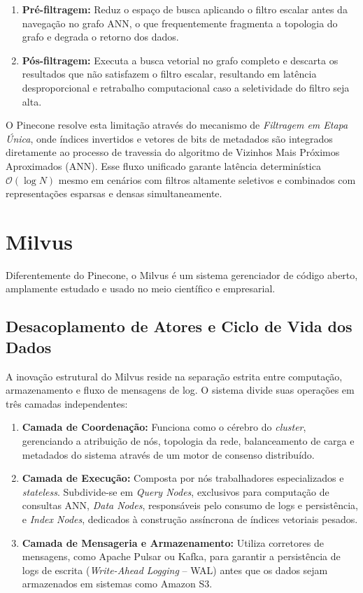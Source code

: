 \documentclass[a4paper, 12pt]{article}
\begin{document}
\begin{enumerate}
    \item \textbf{Pré-filtragem:} Reduz o espaço de busca aplicando o filtro escalar antes da navegação no grafo ANN, o que frequentemente fragmenta a topologia do grafo e degrada o retorno dos dados.
    \item \textbf{Pós-filtragem:} Executa a busca vetorial no grafo completo e descarta os resultados que não satisfazem o filtro escalar, resultando em latência desproporcional e retrabalho computacional caso a seletividade do filtro seja alta.
\end{enumerate}

O Pinecone resolve esta limitação através do mecanismo de \textit{Filtragem em Etapa Única}, onde índices invertidos e vetores de bits de metadados são integrados diretamente ao processo de travessia do algoritmo de Vizinhos Mais Próximos Aproximados (ANN). Esse fluxo unificado garante latência determinística $\mathcal{O}(\log N)$ mesmo em cenários com filtros altamente seletivos e combinados com representações esparsas e densas simultaneamente.

\section{Milvus}
\label{sec:milvus}

Diferentemente do Pinecone, o Milvus é um sistema gerenciador de código aberto, amplamente estudado e usado no meio científico e empresarial.

\subsection{Desacoplamento de Atores e Ciclo de Vida dos Dados}
A inovação estrutural do Milvus reside na separação estrita entre computação, armazenamento e fluxo de mensagens de log. O sistema divide suas operações em três camadas independentes:

\begin{enumerate}
    \item \textbf{Camada de Coordenação:} Funciona como o cérebro do \textit{cluster}, gerenciando a atribuição de nós, topologia da rede, balanceamento de carga e metadados do sistema através de um motor de consenso distribuído.
    \item \textbf{Camada de Execução:} Composta por nós trabalhadores especializados e \textit{stateless}. Subdivide-se em \textit{Query Nodes}, exclusivos para computação de consultas ANN, \textit{Data Nodes}, responsáveis pelo consumo de logs e persistência, e \textit{Index Nodes}, dedicados à construção assíncrona de índices vetoriais pesados.
    \item \textbf{Camada de Mensageria e Armazenamento:} Utiliza corretores de mensagens, como Apache Pulsar ou Kafka, para garantir a persistência de logs de escrita (\textit{Write-Ahead Logging} -- WAL) antes que os dados sejam armazenados em sistemas como Amazon S3.
\end{enumerate}
\end{document}
